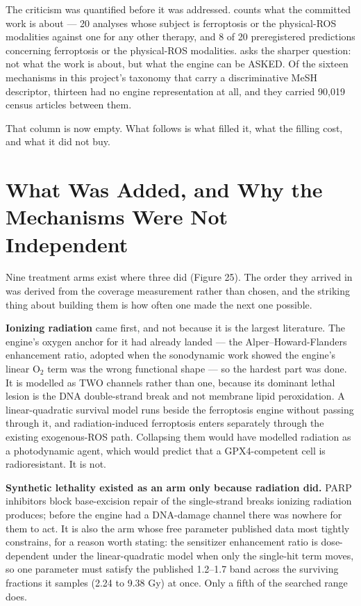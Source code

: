 \documentclass[11pt,twoside,openright]{report}
\begin{document}
The criticism was quantified before it was addressed.  counts what the committed work is about --- 20 analyses whose subject is ferroptosis or the physical-ROS modalities against one for any other therapy, and 8 of 20 preregistered predictions concerning ferroptosis or the physical-ROS modalities.  asks the sharper question: not what the work is about, but what the engine can be ASKED. Of the sixteen mechanisms in this project's taxonomy that carry a discriminative MeSH descriptor, thirteen had no engine representation at all, and they carried 90,019 census articles between them.

That column is now empty. What follows is what filled it, what the filling cost, and what it did not buy.

\section{What Was Added, and Why the Mechanisms Were Not Independent}

Nine treatment arms exist where three did (Figure 25). The order they arrived in was derived from the coverage measurement rather than chosen, and the striking thing about building them is how often one made the next one possible.

\textbf{Ionizing radiation} came first, and not because it is the largest literature. The engine's oxygen anchor for it had already landed --- the Alper–Howard-Flanders enhancement ratio, adopted when the sonodynamic work showed the engine's linear O$_2$ term was the wrong functional shape --- so the hardest part was done. It is modelled as TWO channels rather than one, because its dominant lethal lesion is the DNA double-strand break and not membrane lipid peroxidation. A linear-quadratic survival model runs beside the ferroptosis engine without passing through it, and radiation-induced ferroptosis enters separately through the existing exogenous-ROS path. Collapsing them would have modelled radiation as a photodynamic agent, which would predict that a GPX4-competent cell is radioresistant. It is not.

\textbf{Synthetic lethality existed as an arm only because radiation did.} PARP inhibitors block base-excision repair of the single-strand breaks ionizing radiation produces; before the engine had a DNA-damage channel there was nowhere for them to act. It is also the arm whose free parameter published data most tightly constrains, for a reason worth stating: the sensitizer enhancement ratio is dose-dependent under the linear-quadratic model when only the single-hit term moves, so one parameter must satisfy the published 1.2–1.7 band across the surviving fractions it samples (2.24 to 9.38 Gy) at once. Only a fifth of the searched range does.
\end{document}
